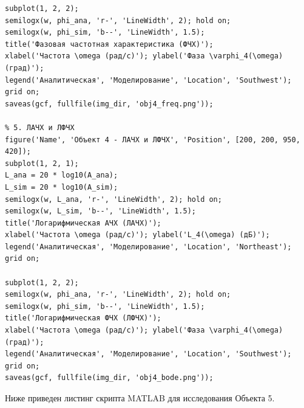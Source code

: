 \documentclass[12pt, a4paper]{article}
\begin{document}
\begin{lstlisting}[caption={Скрипт MATLAB для исследования Объекта 4}]
subplot(1, 2, 2);
semilogx(w, phi_ana, 'r-', 'LineWidth', 2); hold on;
semilogx(w, phi_sim, 'b--', 'LineWidth', 1.5);
title('Фазовая частотная характеристика (ФЧХ)');
xlabel('Частота \omega (рад/с)'); ylabel('Фаза \varphi_4(\omega) (град)');
legend('Аналитическая', 'Моделирование', 'Location', 'Southwest'); grid on;
saveas(gcf, fullfile(img_dir, 'obj4_freq.png'));

% 5. ЛАЧХ и ЛФЧХ
figure('Name', 'Объект 4 - ЛАЧХ и ЛФЧХ', 'Position', [200, 200, 950, 420]);
subplot(1, 2, 1);
L_ana = 20 * log10(A_ana);
L_sim = 20 * log10(A_sim);
semilogx(w, L_ana, 'r-', 'LineWidth', 2); hold on;
semilogx(w, L_sim, 'b--', 'LineWidth', 1.5);
title('Логарифмическая АЧХ (ЛАЧХ)');
xlabel('Частота \omega (рад/с)'); ylabel('L_4(\omega) (дБ)');
legend('Аналитическая', 'Моделирование', 'Location', 'Northeast'); grid on;

subplot(1, 2, 2);
semilogx(w, phi_ana, 'r-', 'LineWidth', 2); hold on;
semilogx(w, phi_sim, 'b--', 'LineWidth', 1.5);
title('Логарифмическая ФЧХ (ЛФЧХ)');
xlabel('Частота \omega (рад/с)'); ylabel('Фаза \varphi_4(\omega) (град)');
legend('Аналитическая', 'Моделирование', 'Location', 'Southwest'); grid on;
saveas(gcf, fullfile(img_dir, 'obj4_bode.png'));
\end{lstlisting}


Ниже приведен листинг скрипта MATLAB для исследования Объекта 5.
\end{document}
